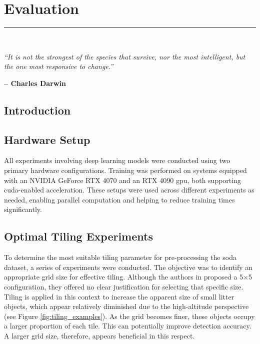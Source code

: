\graphicspath{{content/chapters/5_evaluation/figures/}}

\chapter{Evaluation}%
\label{chp:evaluation}
\rule{\textwidth}{1pt} \\[1ex]

\epigraph{\textit{``It is not the strongest of the species that survive, nor the most intelligent, but the one most responsive to change.''}}{\textbf{-- Charles Darwin}}

\section{Introduction}
\label{sec:5_introduction}

\section{Hardware Setup}
\label{sec:5_hardware_setup}

All experiments involving deep learning models were conducted using two primary hardware configurations. Training was performed on systems equipped with an NVIDIA GeForce RTX 4070 and an RTX 4090 \gls{gpu}, both supporting \gls{cuda}-enabled acceleration. These setups were used across different experiments as needed, enabling parallel computation and helping to reduce training times significantly.


\section{Optimal Tiling Experiments}
\label{sec:5_tiling_exp}

To determine the most suitable tiling parameter for pre-processing the \gls{soda} dataset, a series of experiments were conducted. The objective was to identify an appropriate grid size for effective tiling. Although the authors in \cite{detect_litter} proposed a 5$\times$5 configuration, they offered no clear justification for selecting that specific size.
Tiling is applied in this context to increase the apparent size of small litter objects, which appear relatively diminished due to the high-altitude perspective (see Figure \ref{fig:tiling_examples}). As the grid becomes finer, these objects occupy a larger proportion of each tile. This can potentially improve detection accuracy. A larger grid size, therefore, appears beneficial in this respect.

